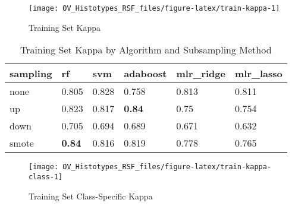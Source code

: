 \documentclass[
]{report}
\begin{document}
\begin{figure}[H]

{\centering \texttt{[image: OV\_Histotypes\_RSF\_files/figure-latex/train-kappa-1]} 

}

\caption{Training Set Kappa}\label{fig:train-kappa}
\end{figure}

\begin{table}

\caption{\label{tab:train-kappa-table}Training Set Kappa by Algorithm and Subsampling Method}
\centering
\begin{tabular}[t]{l|l|l|l|l|l}
\hline
sampling & rf & svm & adaboost & mlr\_ridge & mlr\_lasso\\
\hline
none & 0.805 & 0.828 & 0.758 & 0.813 & 0.811\\
\hline
up & 0.823 & 0.817 & \textbf{0.84} & 0.75 & 0.754\\
\hline
down & 0.705 & 0.694 & 0.689 & 0.671 & 0.632\\
\hline
smote & \textbf{0.84} & 0.816 & 0.819 & 0.778 & 0.765\\
\hline
\end{tabular}
\end{table}

\begin{figure}[H]

{\centering \texttt{[image: OV\_Histotypes\_RSF\_files/figure-latex/train-kappa-class-1]} 

}

\caption{Training Set Class-Specific Kappa}\label{fig:train-kappa-class}
\end{figure}
\end{document}
